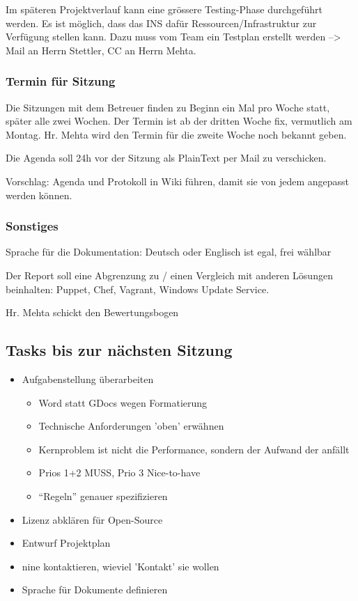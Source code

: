 \documentclass[class=scrbook,crop=false]{standalone}
\begin{document}
    Im späteren Projektverlauf kann eine grössere Testing-Phase durchgeführt werden. Es ist möglich, dass das INS dafür Ressourcen/Infrastruktur zur Verfügung stellen kann. Dazu muss vom Team ein Testplan erstellt werden --> Mail an Herrn Stettler, CC an Herrn Mehta.

    \subsubsection*{Termin für Sitzung}

    Die Sitzungen mit dem Betreuer finden zu Beginn ein Mal pro Woche statt, später alle zwei Wochen. Der Termin ist ab der dritten Woche fix, vermutlich am Montag. Hr. Mehta wird den Termin für die zweite Woche noch bekannt geben.

    Die Agenda soll 24h vor der Sitzung als PlainText per Mail zu verschicken.

    Vorschlag: Agenda und Protokoll in Wiki führen, damit sie von jedem angepasst werden können.


	\subsubsection*{Sonstiges}
	
	Sprache für die Dokumentation: Deutsch oder Englisch ist egal, frei wählbar
	
    Der Report soll eine Abgrenzung zu / einen Vergleich mit anderen Lösungen beinhalten: Puppet, Chef, Vagrant, Windows Update Service.
    
    Hr. Mehta schickt den Bewertungsbogen

    \subsection*{Tasks bis zur nächsten Sitzung}
    
    \begin{itemize}
        \item Aufgabenstellung überarbeiten
        \begin{itemize}
            \item Word statt GDocs wegen Formatierung
            \item Technische Anforderungen 'oben' erwähnen
            \item Kernproblem ist nicht die Performance, sondern der Aufwand der anfällt
            \item Prios 1+2 MUSS, Prio 3 Nice-to-have
            \item “Regeln” genauer spezifizieren
        \end{itemize}
        \item Lizenz abklären für Open-Source
        \item Entwurf Projektplan
        \item \gls{nine} kontaktieren, wieviel 'Kontakt' sie wollen
        \item Sprache für Dokumente definieren
    \end{itemize}
\end{document}
